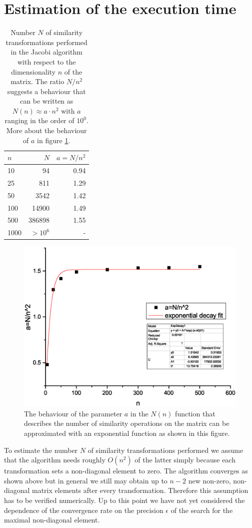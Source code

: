 \documentclass[11pt,a4wide]{article}
\begin{document}
\section{Estimation of the execution time}
\begin{table}%
\centering
\caption{Number $N$ of similarity transformations performed in the Jacobi algorithm with respect to the dimensionality $n$ of the matrix. The ratio $N/n^2$ suggests a behaviour that can be written as $N(n)\approx a\cdot n^2$ with $a$ ranging in the order of $10^0$. More about the behaviour of $a$ in figure \ref{fig:a}.}
\begin{tabular}{lrr}\hline
$n$ & $N$ & $a=N/n^2$\\\hline
10 & 94 & 0.94\\
25 & 811 & 1.29\\
50 & 3542 & 1.42\\
100 & 14900 &1.49\\
500 & 386898 &1.55\\
1000 & $>10^6$ &-\\\hline
\end{tabular}
\label{tab:extime}
\end{table}
\begin{figure}[T]%
\centering
\includegraphics[scale=0.45]{b2.eps}%
\caption{The behaviour of the parameter $a$ in the $N(n)$ function that describes the number of similarity operations on the matrix can be approximated with an exponential function as shown in this figure.}%
\label{fig:a}%
\end{figure}
To estimate the number $N$ of similarity transformations performed we assume that the algorithm needs roughly $O(n^2)$ of the latter simply because each transformation sets a non-diagonal element to zero. The algorithm converges as shown above but in general we still may obtain up to $n-2$ new non-zero, non-diagonal matrix elements after every transformation. Therefore this assumption has to be verified numerically. Up to this point we have not yet considered the dependence of the convergence rate on the precision $\epsilon$ of the search for the maximal non-diagonal element.
\end{document}
